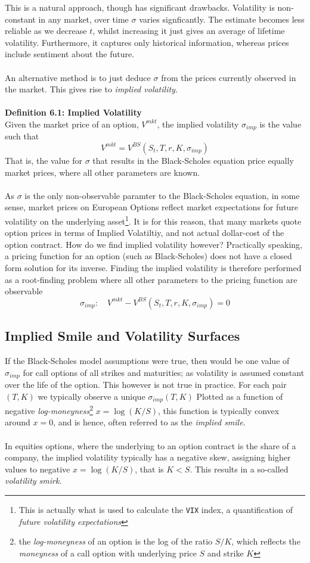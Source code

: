 \documentclass{article}
\def\code#1{\texttt{#1}}
\begin{document}
This is a natural approach, though has significant drawbacks. Volatility is non-constant in any market, over time $\sigma$ varies signficantly. The estimate becomes less reliable as we decrease $t$, whilst increasing it just gives an average of lifetime volatility. Furthermore, it captures only historical information, whereas prices include sentiment about the future. \\
\\
An alternative method is to just deduce $\sigma$ from the prices currently observed in the market. This gives rise to \textit{implied volatility}. \\
\\
\textbf{Definition 6.1: Implied Volatility}\\
Given the market price of an option, $V^{mkt}$, the implied volatility $\sigma_{imp}$ is the value such that 
$$V^{mkt} = V^{BS}(S_t, T, r, K, \sigma_{imp})$$
That is, the value for $\sigma$ that results in the Black-Scholes equation price equally market prices, where all other parameters are known. \\
\\
As $\sigma$ is the only non-observable paramter to the Black-Scholes equation, in some sense, market prices on European Options reflect market expectations for future volatility on the underlying asset\footnote{This is actually what is used to calculate the \code{VIX} index, a quantification of \textit{future volatility expectations}}. It is for this reason, that many markets quote option prices in terms of Implied Volatiltiy, and not actual dollar-cost of the option contract. How do we find implied volatility however? Practically speaking, a pricing function for an option (such as Black-Scholes) does not have a closed form solution for its inverse. Finding the implied volatility is therefore performed as a root-finding problem where all other parameters to the pricing function are observable
$$\sigma_{imp}:\quad V^{mkt} - V^{BS}(S_t, T, r, K, \sigma_{imp}) = 0$$

\subsection{Implied Smile and Volatility Surfaces}
If the Black-Scholes model assumptions were true, then would be one value of $\sigma_{imp}$ for call options of all strikes and maturities; as volatility is assumed constant over the life of the option. This however is not true in practice. For each pair $(T,K)$ we typically observe a unique $\sigma_{imp}(T,K)$ Plotted as a function of negative \textit{log-moneyness}\footnote{the \textit{log-moneyness} of an option is the log of the ratio $S/K$, which reflects the \textit{moneyness} of a call option with underlying price $S$ and strike $K$} $x = \log(K/S)$, this function is typically convex around $x=0$, and is hence, often referred to as the \textit{implied smile}. \\
\\
In equities options, where the underlying to an option contract is the share of a company, the implied volatility typically has a negative skew, assigning higher values to negative $x=\log(K/S)$, that is $K<S$. This results in a so-called \textit{volatility smirk}.
\end{document}
